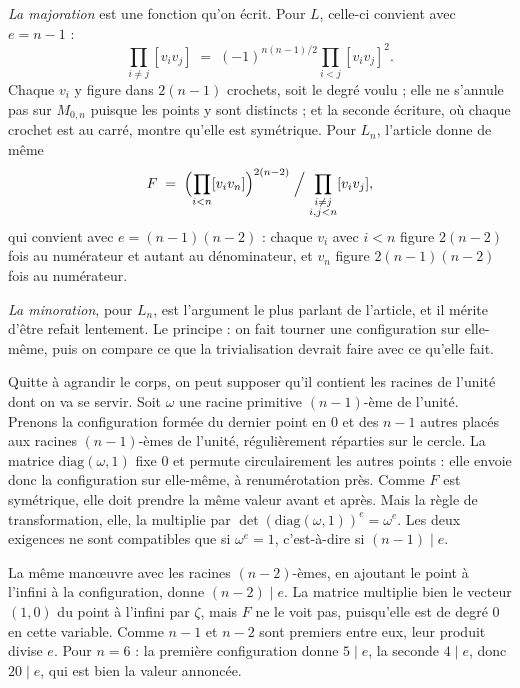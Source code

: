 \documentclass[11pt,a4paper]{amsart}
\theoremstyle{definition}
\theoremstyle{plain}
\theoremstyle{remark}
\newcommand{\M}{M_{0,n}}
\begin{document}
\emph{La majoration} est une fonction qu'on écrit. Pour $L$, celle-ci convient avec $e = n-1$ :
\[
\prod_{i\ne j}[v_iv_j] \;=\; (-1)^{n(n-1)/2}\prod_{i<j}[v_iv_j]^2 .
\]
Chaque $v_i$ y figure dans $2(n-1)$ crochets, soit le degré voulu ; elle ne s'annule pas sur $\M$ puisque les points y sont distincts ; et la seconde écriture, où chaque crochet est au carré, montre qu'elle est symétrique. Pour $L_n$, l'article donne de même
\[
F \;=\; \Bigl(\prod_{i<n}[v_iv_n]\Bigr)^{2(n-2)} \Bigm/ \prod_{\substack{i \ne j\\ i,j<n}}[v_iv_j],
\]
qui convient avec $e = (n-1)(n-2)$ : chaque $v_i$ avec $i < n$ figure $2(n-2)$ fois au numérateur et autant au dénominateur, et $v_n$ figure $2(n-1)(n-2)$ fois au numérateur.

\emph{La minoration}, pour $L_n$, est l'argument le plus parlant de l'article, et il mérite d'être refait lentement. Le principe : on fait tourner une configuration sur elle-même, puis on compare ce que la trivialisation devrait faire avec ce qu'elle fait.

Quitte à agrandir le corps, on peut supposer qu'il contient les racines de l'unité dont on va se servir. Soit $\omega$ une racine primitive $(n-1)$-ème de l'unité. Prenons la configuration formée du dernier point en $0$ et des $n-1$ autres placés aux racines $(n-1)$-èmes de l'unité, régulièrement réparties sur le cercle. La matrice $\mathrm{diag}(\omega, 1)$ fixe $0$ et permute circulairement les autres points : elle envoie donc la configuration sur elle-même, à renumérotation près. Comme $F$ est symétrique, elle doit prendre la même valeur avant et après. Mais la règle de transformation, elle, la multiplie par $\det(\mathrm{diag}(\omega,1))^e = \omega^e$. Les deux exigences ne sont compatibles que si $\omega^e = 1$, c'est-à-dire si $(n-1) \mid e$.

La même manœuvre avec les racines $(n-2)$-èmes, en ajoutant le point à l'infini à la configuration, donne $(n-2) \mid e$. La matrice multiplie bien le vecteur $(1,0)$ du point à l'infini par $\zeta$, mais $F$ ne le voit pas, puisqu'elle est de degré $0$ en cette variable. Comme $n-1$ et $n-2$ sont premiers entre eux, leur produit divise $e$. Pour $n = 6$ : la première configuration donne $5 \mid e$, la seconde $4 \mid e$, donc $20 \mid e$, qui est bien la valeur annoncée.
\end{document}
